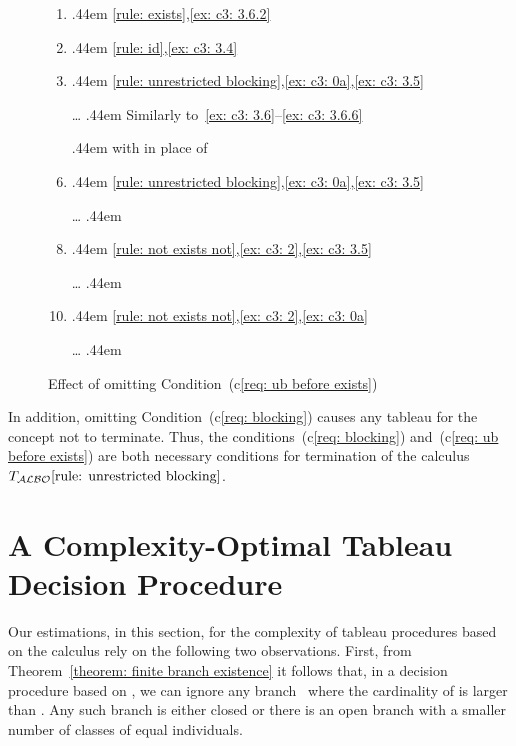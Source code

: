\documentclass[leqno
,pdflatex
,prodmode
,acmtocl
]{acmsmall}
\makeatletter
\newcommand{\mathcmd}[1]{\ensuremath{#1}\xspace}
\newcommand{\dlfont}{\mathcal}
\newcommand{\dl}[1]{\mathcmd{\dlfont{#1}}}
\newcommand{\ALBOid}{\dl{ALBO\smash[t]{\mbox{}}}}
\def\Not{\neg}
\def\tfillsymbol{\mbox{\fontsize{3}{4}\selectfont.}}
\def\tfill{\leavevmode
  \cleaders \hb@xt@ .44em{\hss{\tfillsymbol}\hss}\hfill
  \kern\z@}
\newcommand{\titem}[2]{\tfill #2}
\newcommand{\tbranch}{{\blacktriangleright}}
\newcommand{\indiv}{a}
\newcommand{\cname}{A}
\newcommand{\rname}{Q}
\newcommand{\TALBOidub}{\mathcmd{T_\ALBOid\eqref{rule: unrestricted blocking}}}
\renewcommand{\tbranch}{{\qquad\blacktriangleright}}
\makeatother
\begin{document}
\begin{figure}[tbu]
\begin{center}
\begin{minipage}{.75\textwidth}
\begin{enumerate}[1.]
   \item\label{ex: c3: 3.6.4}
        \titem{\tskip[2]\indiv_2:\cname}{\eqref{rule: exists},\ref{ex: c3: 3.6.2}}
   \item\label{ex: c3: 3.6.5}
        \titem{\tskip[2]\indiv_2:\{\indiv_2\}}{\eqref{rule: id},\ref{ex: c3: 3.4}}
   \item\label{ex: c3: 3.6.6}   
        \titem{\tskip[2]\tbranch\indiv_0:\{\indiv_1\}}{\eqref{rule: unrestricted blocking},\ref{ex: c3: 0a},\ref{ex: c3: 3.5}}
   \item[\ldots]\titem{\tskip[3]\textbf{Non-terminating}}{Similarly to~\ref{ex: c3: 3.6}--\ref{ex: c3: 3.6.6}} 
   \item[]\titem{\tskip[3]{}}{with  in place of } 
   \item\label{ex: c3: 3.6.7}   
        \titem{\tskip[2]\tbranch\indiv_0:\Not\{\indiv_1\}}{\eqref{rule: unrestricted blocking},\ref{ex: c3: 0a},\ref{ex: c3: 3.5}}
   \item[\ldots]\titem{\tskip[3]{}}{} 
   \item\label{ex: c3: 3.7}
        \titem{\tskip\tbranch\indiv_1:\Not\Not\exists \rname.\cname}{\eqref{rule: not exists not},\ref{ex: c3: 2},\ref{ex: c3: 3.5}} 
   \item[\ldots]\titem{\tskip[2]{}}{} 
   \item\label{ex: c3: 4}
        \titem{\tbranch\indiv_0:\Not\Not\exists \rname.\cname}{\eqref{rule: not exists not},\ref{ex: c3: 2},\ref{ex: c3: 0a}} 
   \item[\ldots]\titem{\tskip{}}{}
  \end{enumerate}
  \end{minipage}
 \end{center}
\caption{Effect of omitting Condition~(c\ref{req: ub before exists})}\label{figure: req: ub before exists}
\end{figure}
In addition, omitting Condition~(c\ref{req: blocking}) causes any tableau for the concept  not to terminate.
Thus, the conditions~(c\ref{req: blocking}) and~(c\ref{req: ub before exists}) are both necessary
conditions for termination of the calculus \TALBOidub. 

\section{A Complexity-Optimal Tableau Decision Procedure}
\label{section: Complexity}

Our estimations, in this section, for the complexity of tableau procedures based on the  calculus
rely on the following two observations.
First, from Theorem~\ref{theorem: finite branch existence} 
it follows that, in a decision procedure based on ,
we can ignore any branch~ where the cardinality of  is larger than .
Any such branch is either closed or there is an open branch
with a smaller number of classes of equal individuals.
\end{document}
